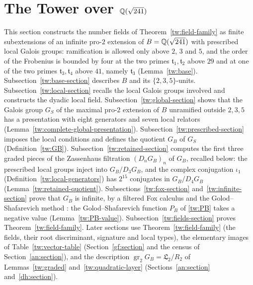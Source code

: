 \section{\texorpdfstring{The Tower over $\mathbb Q(\sqrt{241})$}{The Tower over Q(sqrt 241)}}\label{tw:tower}

This section constructs the number fields of Theorem~\ref{tw:field-family}
as finite subextensions of an infinite pro-$2$ extension of $B=\mathbb Q(\sqrt{241})$
with prescribed local Galois groups: ramification is allowed only above
$2$, $3$ and $5$, and the order of the Frobenius is bounded by four at the
two primes $\mathfrak t_1,\mathfrak t_2$ above $29$ and at one of the two
primes $\mathfrak t_3,\mathfrak t_4$ above $41$, namely $\mathfrak t_3$
(Lemma~\ref{tw:base}). Subsection~\ref{tw:base-section} describes $B$ and its
$\{2,3,5\}$-units. Subsection~\ref{tw:local-section} recalls the local Galois
groups involved and constructs the dyadic local field.
Subsection~\ref{tw:global-section} shows that the Galois group
$G_S$ of the maximal pro-$2$ extension of $B$ unramified outside
$2,3,5$ has a presentation with eight generators and seven local relators
(Lemma~\ref{tw:complete-global-presentation}).
Subsection~\ref{tw:prescribed-section} imposes the local conditions and
defines the quotient $G_B$ of $G_S$ (Definition~\ref{tw:GB}).
Subsection~\ref{tw:retained-section} computes the first three graded pieces
of the Zassenhaus filtration $(D_nG_B)_n$ of $G_B$, recalled below: the
prescribed local groups inject into $G_B/D_3G_B$, and the complex
conjugation $\iota_1$ (Definition~\ref{tw:local-generators}) has $2^{15}$
conjugates in $G_B/D_4G_B$ (Lemma~\ref{tw:retained-quotient}).
Subsections~\ref{tw:fox-section} and~\ref{tw:infinite-section} prove that
$G_B$ is infinite, by a filtered Fox calculus and the Golod--Shafarevich
method \cite{GolodShafarevich}: the Golod--Shafarevich function $P_B$ of
\eqref{tw:PB} takes a negative value (Lemma~\ref{tw:PB-value}).
Subsection~\ref{tw:fields-section} proves Theorem~\ref{tw:field-family}.
Later sections use Theorem~\ref{tw:field-family} (the fields, their root
discriminant, signature and local types), the elementary images of
Table~\ref{tw:vector-table} (Section~\ref{gf:section} and the census of
Section~\ref{an:section}), and the description
$\operatorname{gr}_2G_B=\mathfrak L_2/R_2$ of Lemmas~\ref{tw:graded}
and~\ref{tw:quadratic-layer} (Sections~\ref{an:section}
and~\ref{dh:section}).

